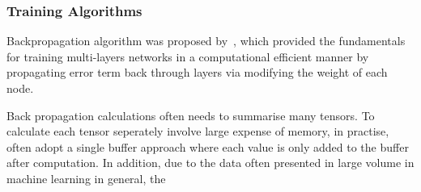 \subsubsection{Training Algorithms}
Backpropagation algorithm was proposed by~\citet{werbos1975beyond}, which provided the fundamentals for training multi-layers networks in a computational efficient manner by propagating error term back through layers via modifying the weight of each node. 
\par
Back propagation calculations often needs to summarise many tensors. To calculate each tensor seperately involve large expense of memory, in practise, often adopt a single buffer approach where each value is only added to the buffer after computation. In addition, due to the data often presented in large volume in machine learning in general, the 